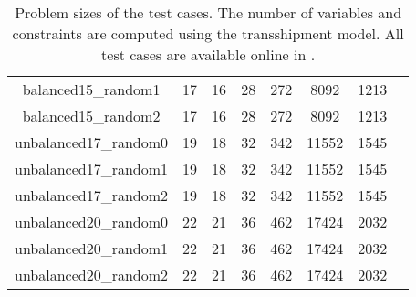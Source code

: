 \begin{table}[ht!]
\begin{adjustbox}{center}
\begin{tabular}{|cccccccc|}
balanced15\_random1 & 17 & 16 & 28 & 272 & 8092 & 1213 &  \\ 
balanced15\_random2 & 17 & 16 & 28 & 272 & 8092 & 1213 &  \\ 
unbalanced17\_random0 & 19 & 18 & 32 & 342 & 11552 & 1545 &  \\ 
unbalanced17\_random1 & 19 & 18 & 32 & 342 & 11552 & 1545 &  \\ 
unbalanced17\_random2 & 19 & 18 & 32 & 342 & 11552 & 1545 &  \\ 
unbalanced20\_random0 & 22 & 21 & 36 & 462 & 17424 & 2032 &  \\ 
unbalanced20\_random1 & 22 & 21 & 36 & 462 & 17424 & 2032 &  \\ 
unbalanced20\_random2 & 22 & 21 & 36 & 462 & 17424 & 2032 &  \\ 
\hline 
\end{tabular} 
\end{adjustbox} 
\vspace*{-0.2cm} 
\caption{Problem sizes of the test cases. The number of variables and constraints are computed using the transshipment model. All test cases are available online in \cite{source_code}.} 
\label{Table:Problem_Sizes} 
\end{table} 
